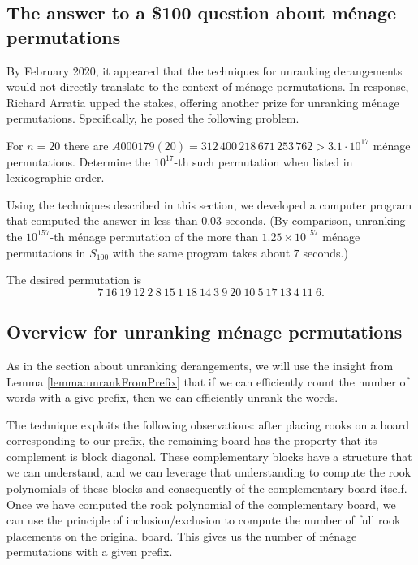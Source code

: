 \subsection{The answer to a \$100 question about m\'enage permutations}
By February 2020, it appeared that the techniques for unranking derangements
would not directly translate to the context of m\'enage permutations. In
response, Richard Arratia upped the stakes, offering another prize for
unranking m\'enage permutations. Specifically, he posed the following problem.
\begin{problem}
  For $n=20$ there are $A000179(20) = 312\,400\,218\,671\,253\,762 > 3.1\cdot 10^{17}$
  m\'enage permutations.
  Determine the $10^{17}$-th such permutation when listed in lexicographic order.
\end{problem}
Using the techniques described in this section, we developed a computer program that
computed the answer in less than $0.03$ seconds.
(By comparison, unranking the $10^{157}$-th m\'enage permutation of the more
than $1.25 \times 10^{157}$ m\'enage permutations in $S_{100}$
with the same program takes about $7$ seconds.)
\begin{answer}
  The desired permutation is \begin{equation}
    7\ 16\ 19\ 12\ 2\ 8\ 15\ 1\ 18\ 14\ 3\ 9\ 20\ 10\ 5\ 17\ 13\ 4\ 11\ 6.
  \end{equation}
\end{answer}

\subsection{Overview for unranking m\'enage permutations}

As in the section about unranking derangements, we will use the insight from
Lemma \ref{lemma:unrankFromPrefix} that if we can efficiently count the number
of words with a give prefix, then we can efficiently unrank the words.

The technique exploits the following observations:
after placing rooks on a board corresponding to our
prefix, the remaining board has the property that its complement is block
diagonal. These complementary blocks have a structure that we can understand,
and we can leverage that understanding to compute the rook polynomials of these
blocks and consequently of the complementary board itself. Once we have computed
the rook polynomial of the complementary board, we can use the principle of
inclusion/exclusion to compute the number of full rook placements on the
original board.
This gives us the number of m\'enage permutations with a given prefix.

